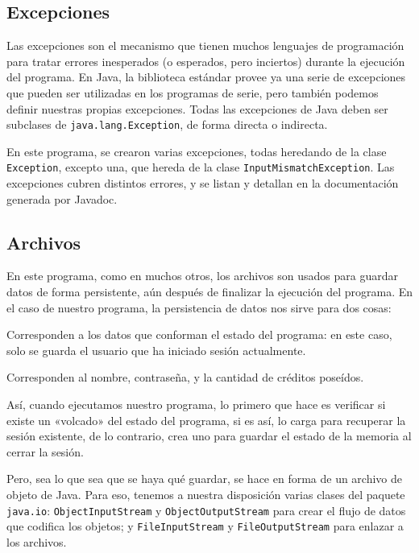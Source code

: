 \documentclass[letterpaper,12pt]{article}
\begin{document}
\subsection{Excepciones}
Las excepciones son el mecanismo que tienen muchos lenguajes de programación para tratar errores inesperados (o esperados, pero inciertos) durante la ejecución del programa. En Java, la biblioteca estándar provee ya una serie de excepciones que pueden ser utilizadas en los programas de serie, pero también podemos definir nuestras propias excepciones. Todas las excepciones de Java deben ser subclases de \texttt{java.lang.Exception}, de forma directa o indirecta.

En este programa, se crearon varias excepciones, todas heredando de la clase \texttt{Exception}, excepto una, que hereda de la clase \texttt{InputMismatchException}. Las excepciones cubren distintos errores, y se listan y detallan en la documentación generada por Javadoc.

\subsection{Archivos}
En este programa, como en muchos otros, los archivos son usados para guardar datos de forma persistente, aún después de finalizar la ejecución del programa. En el caso de nuestro programa, la persistencia de datos nos sirve para dos cosas:

\begin{description}[style=nextline]
\item[Datos de sesión]
Corresponden a los datos que conforman el estado del programa: en este caso, solo se guarda el usuario que ha  iniciado sesión actualmente.

\item[Datos de usuario]
Corresponden al nombre, contraseña, y la cantidad de créditos poseídos.
\end{description}

Así, cuando ejecutamos nuestro programa, lo primero que hace es verificar si existe un «volcado» del estado del programa, si es así, lo carga para recuperar la sesión existente, de lo contrario, crea uno para guardar el estado de la memoria al cerrar la sesión.

Pero, sea lo que sea que se haya qué guardar, se hace en forma de un archivo de objeto de Java. Para eso, tenemos a nuestra disposición varias clases del paquete \texttt{java.io}: \texttt{ObjectInputStream} y \texttt{ObjectOutputStream} para crear el flujo de datos que codifica los objetos; y \texttt{FileInputStream} y \texttt{FileOutputStream} para enlazar a los archivos.
\end{document}
